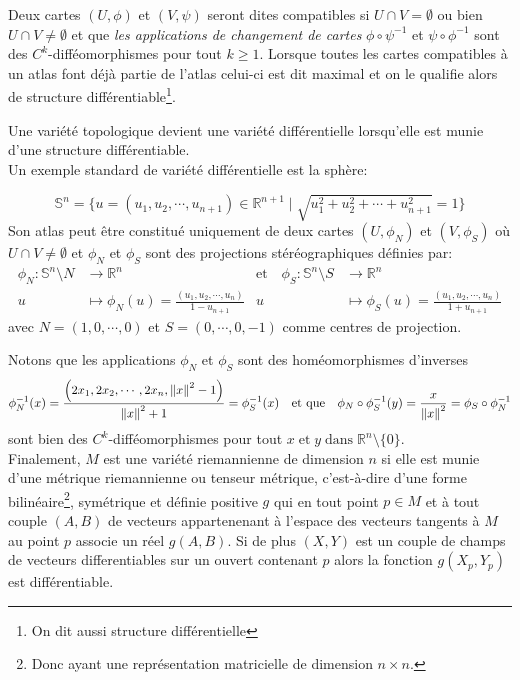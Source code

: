 \documentclass[11pt, letterpaper]{article}
\begin{document}
	Deux cartes $(U, \phi)$ et $(V, \psi)$ seront dites compatibles si $U \cap V=\emptyset$ ou bien $U\cap V\neq \emptyset$ et que \textit{les applications de changement de cartes} $\phi\circ\psi^{-1}$ et $\psi\circ\phi^{-1}$ sont des $C^{k}$-difféomorphismes pour tout $k\geq 1$. Lorsque toutes les cartes compatibles à un atlas font déjà partie de l'atlas celui-ci est dit maximal et on le qualifie alors de structure différentiable\footnote{On dit aussi structure différentielle}.
	
	Une variété topologique devient une variété différentielle lorsqu'elle est munie d'une structure différentiable. \\ 
	
	Un exemple standard de variété différentielle est la sphère: 
	
	\begin{equation*}
	    \mathbb{S}^n=\{u=(u_1, u_2,\cdots, u_{n+1}) \in\mathbb{R}^{n+1}\mid\sqrt{u_1^2+u_2^2+\cdots+u_{n+1}^2}=1\}
	\end{equation*}
	Son atlas peut être constitué uniquement de deux cartes $\left(U, \phi_N \right)$ et $\left (V, \phi_S \right)$ où $U\cap V \neq \emptyset$ et $\phi_N$ et $\phi_S$ sont des projections stéréographiques définies par:
	\begin{align*}
	\phi_N\colon\mathbb{S}^n\setminus{N}&\longrightarrow\mathbb{R}^n &\text{et} \quad\phi_S\colon\mathbb{S}^n\setminus{S}&\longrightarrow\mathbb{R}^n\\
	   u &\longmapsto\phi_N(u)=\frac{(u_1, u_2,\cdots, u_n)}{1-u_{n+1}}  &  u&\longmapsto\phi_S(u)=\frac{(u_1, u_2,\cdots, u_n)}{1+u_{n+1}}
	\end{align*}
	avec $N=(1, 0, \cdots, 0)$ et $S=(0, \cdots, 0, -1)$ comme centres de projection.
	
	Notons que les applications $\phi_N$ et $\phi_S$ sont des homéomorphismes d'inverses
	\begin{equation*}
		\phi_N^{-1}(x)=\frac{\left (2x_1, 2x_2, \cdots, 2x_n, \norm{x}^2-1\right)}{\norm{x}^2+1}=\phi_S^{-1}(x)\quad\text{et que}\quad \phi_N\circ\phi_S^{-1}(y)=\frac{x}{\norm{x}^2}=\phi_S\circ\phi_N^{-1}   
	\end{equation*}
	sont bien des $C^{k}$-difféomorphismes pour tout $x\;\text{et}\;y\;\text{dans}\;\mathbb{R}^n\setminus\{0\}$.\\
	
	Finalement,  $M$ est une variété riemannienne de dimension $n$ si elle est munie d'une métrique riemannienne ou tenseur métrique, c'est-à-dire d'une forme bilinéaire\footnote{Donc ayant une représentation matricielle de dimension $n\times n$.}, symétrique et définie positive $g$ qui en tout point $p\in M$ et à tout couple $(A, B)$ de vecteurs appartenenant à l'espace des vecteurs tangents à $M$ au point $p$ associe un réel $g(A, B)$. Si de plus $(X, Y)$ est un couple de champs de vecteurs differentiables sur un ouvert contenant $p$ alors la fonction $g(X_p, Y_p)$ est différentiable.
	
\end{document}
